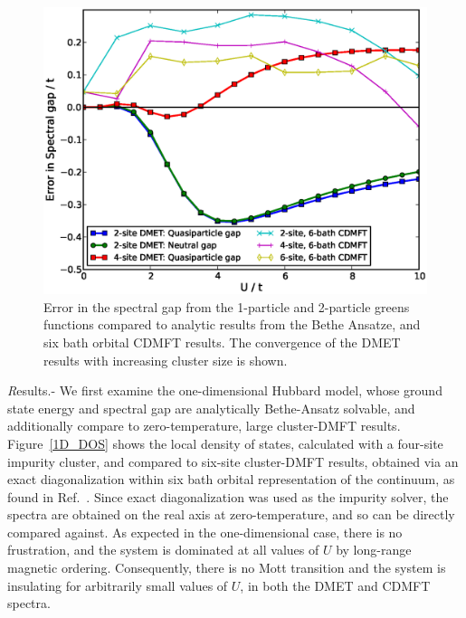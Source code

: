\documentclass[aps,showpacs,twocolumn,nobibnotes]{revtex4}
\begin{document}
\begin{figure}
\begin{center}
    \vspace{-2mm}
\includegraphics[scale=0.475]{Plots/1D_Gap/Hubbard_Gap.eps}
\end{center}
    \vspace{-8mm}
\caption{Error in the spectral gap from the 1-particle and 2-particle greens functions compared to analytic results
from the Bethe Ansatze\cite{Ovchinni1970}, and six bath orbital CDMFT results\cite{Go2009}. The convergence of the
DMET results with increasing cluster size is shown.}
\label{1D_GAP}
\end{figure}

{\emph Results.-} We first examine the one-dimensional Hubbard model, whose ground state energy\cite{Lieb68} and spectral gap\cite{Ovchinni1970} are analytically Bethe-Ansatz solvable, and additionally compare to
zero-temperature, large cluster-DMFT results\cite{Go2009}. Figure~\ref{1D_DOS} shows the local density of states, calculated with a four-site impurity cluster, and compared to six-site
cluster-DMFT results, obtained via an exact diagonalization within six bath orbital representation of the continuum, as found in Ref.~. Since exact diagonalization was used as the impurity solver, 
the spectra are obtained on the real axis at zero-temperature, and so can be directly compared against. As expected in the one-dimensional case, there is no
frustration, and the system is dominated at all values of $U$ by long-range magnetic ordering\cite{Lieb68}. Consequently, there is no Mott transition and the system is insulating for arbitrarily small values of $U$,
in both the DMET and CDMFT spectra. 
\end{document}
